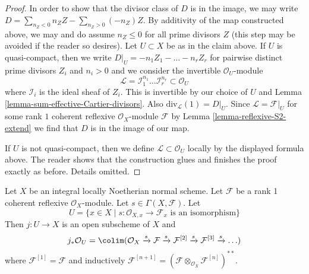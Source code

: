 \begin{proof}
\medskip\noindent
In order to show that the divisor class of $D$ is in the image,
we may write $D = \sum_{n_Z < 0} n_Z Z - \sum_{n_Z > 0} (-n_Z) Z$.
By additivity of the map constructed above, we
may and do assume $n_Z \leq 0$ for all prime divisors $Z$
(this step may be avoided if the reader so desires).
Let $U \subset X$ be as in the claim above. If $U$ is quasi-compact,
then we write $D|_U = -n_1 Z_1 - \ldots - n_r Z_r$ for
pairwise distinct prime divisors $Z_i$ and $n_i > 0$ and
we consider the invertible $\mathcal{O}_U$-module
$$
\mathcal{L} =
\mathcal{I}_1^{n_1} \ldots \mathcal{I}_r^{n_r} \subset \mathcal{O}_U
$$
where $\mathcal{I}_i$ is the ideal sheaf of $Z_i$.
This is invertible by our choice of $U$ and
Lemma \ref{lemma-sum-effective-Cartier-divisors}.
Also $\text{div}_\mathcal{L}(1) = D|_U$.
Since $\mathcal{L} = \mathcal{F}|_U$ for some rank $1$ coherent
reflexive $\mathcal{O}_X$-module $\mathcal{F}$ by
Lemma \ref{lemma-reflexive-S2-extend} we find that $D$ is
in the image of our map.

\medskip\noindent
If $U$ is not quasi-compact, then we define
$\mathcal{L} \subset \mathcal{O}_U$ locally by the displayed formula
above. The reader shows that the construction glues and
finishes the proof exactly as before. Details omitted.
\end{proof}

\begin{lemma}
\label{lemma-structure-sheaf-Xs}
Let $X$ be an integral locally Noetherian normal scheme.
Let $\mathcal{F}$ be a rank 1 coherent reflexive $\mathcal{O}_X$-module.
Let $s \in \Gamma(X, \mathcal{F})$. Let
$$
U = \{x \in X \mid s : \mathcal{O}_{X, x} \to \mathcal{F}_x
\text{ is an isomorphism}\}
$$
Then $j : U \to X$ is an open subscheme of $X$ and
$$
j_*\mathcal{O}_U =
\colim (\mathcal{O}_X \xrightarrow{s} \mathcal{F}
\xrightarrow{s} \mathcal{F}^{[2]}
\xrightarrow{s} \mathcal{F}^{[3]}
\xrightarrow{s} \ldots)
$$
where $\mathcal{F}^{[1]} = \mathcal{F}$ and
inductively $\mathcal{F}^{[n + 1]} =
(\mathcal{F} \otimes_{\mathcal{O}_X} \mathcal{F}^{[n]})^{**}$.
\end{lemma}

